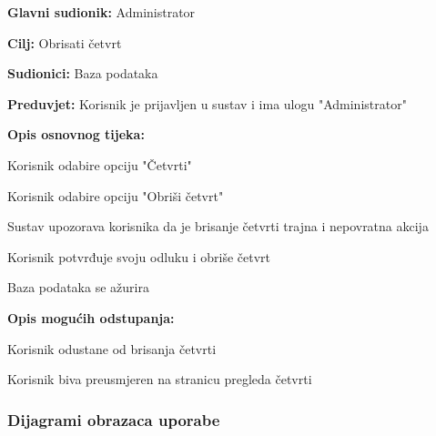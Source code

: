 					\noindent {}
					\begin{packed_item}
	
						\item \textbf{Glavni sudionik: }Administrator
						\item  \textbf{Cilj:} Obrisati četvrt
						\item  \textbf{Sudionici:} Baza podataka
						\item  \textbf{Preduvjet:} Korisnik je prijavljen u sustav i ima ulogu "Administrator"
						\item  \textbf{Opis osnovnog tijeka:}
						
						\item[] \begin{packed_enum}
	
							\item Korisnik odabire opciju "Četvrti"
							\item Korisnik odabire opciju "Obriši četvrt"
							\item Sustav upozorava korisnika da je brisanje četvrti trajna i nepovratna akcija
							\item Korisnik potvrđuje svoju odluku i obriše četvrt
							\item Baza podataka se ažurira
						\end{packed_enum}
						
						\item  \textbf{Opis mogućih odstupanja:}
						
						\item[] \begin{packed_item}
	
							\item[4.a] Korisnik odustane od brisanja četvrti
							\item[] \begin{packed_enum}
								
								\item Korisnik biva preusmjeren na stranicu pregleda četvrti
								
							\end{packed_enum}
							
						\end{packed_item}
					\end{packed_item}
						
				\subsubsection{Dijagrami obrazaca uporabe}
					
